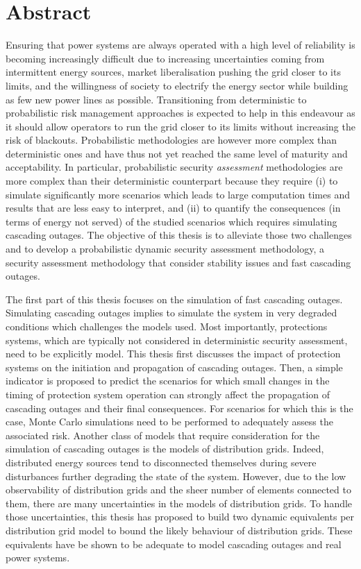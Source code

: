 \chapter*{Abstract}

Ensuring that power systems are always operated with a high level of reliability is becoming increasingly difficult due to increasing uncertainties coming from intermittent energy sources, market liberalisation pushing the grid closer to its limits, and the willingness of society to electrify the energy sector while building as few new power lines as possible. Transitioning from deterministic to probabilistic risk management approaches is expected to help in this endeavour as it should allow operators to run the grid closer to its limits without increasing the risk of blackouts. Probabilistic methodologies are however more complex than deterministic ones and have thus not yet reached the same level of maturity and acceptability. In particular, probabilistic security \emph{assessment} methodologies are more complex than their deterministic counterpart because they require (i) to simulate significantly more scenarios which leads to large computation times and results that are less easy to interpret, and (ii) to quantify the consequences (\eg in terms of energy not served) of the studied scenarios which requires simulating cascading outages. The objective of this thesis is to alleviate those two challenges and to develop a probabilistic dynamic security assessment methodology, \ie a security assessment methodology that consider stability issues and fast cascading outages.

The first part of this thesis focuses on the simulation of fast cascading outages. Simulating cascading outages implies to simulate the system in very degraded conditions which challenges the models used. Most importantly, protections systems, which are typically not considered in deterministic security assessment, need to be explicitly model. This thesis first discusses the impact of protection systems on the initiation and propagation of cascading outages. Then, a simple indicator is proposed to predict the scenarios for which small changes in the timing of protection system operation can strongly affect the propagation of cascading outages and their final consequences. For scenarios for which this is the case, Monte Carlo simulations need to be performed to adequately assess the associated risk. Another class of models that require consideration for the simulation of cascading outages is the models of distribution grids. Indeed, distributed energy sources tend to disconnected themselves during severe disturbances further degrading the state of the system. However, due to the low observability of distribution grids and the sheer number of elements connected to them, there are many uncertainties in the models of distribution grids. To handle those uncertainties, this thesis has proposed to build two dynamic equivalents per distribution grid model to bound the likely behaviour of distribution grids. These equivalents have be shown to be adequate to model cascading outages and real power systems.

